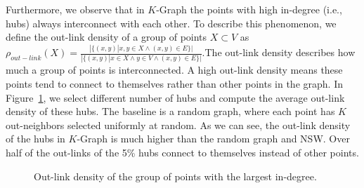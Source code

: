\documentclass[11pt]{article}
\begin{document}
Furthermore, we observe that in $K$-Graph the points with high in-degree (i.e., hubs) always interconnect with each other.
To describe this phenomenon, we define the out-link density of a group of points $X\subset V$ as $\rho_{out-link}(X) = \frac{|\{(x,y)|x, y\in X \wedge (x,y)\in E\}|}{|\{(x,y)|x \in X \wedge y \in V \wedge (x,y)\in E\}|}$.The out-link density describes how much a group of points is interconnected.
A high out-link density means these points tend to connect to themselves rather than other points in the graph.
In Figure~\ref{zeyu_fig:outlink-density}, we select different number of hubs and compute the average out-link density of these hubs.
The baseline is a random graph, where each point has $K$ out-neighbors selected uniformly at random. 
As we can see, the out-link density of the hubs in $K$-Graph is much higher than the random graph and NSW.
Over half of the out-links of the 5\% hubs connect to themselves instead of other points.
\begin{figure}
    \centering
    \caption{Out-link density of the group of points with the largest in-degree.}
    \label{zeyu_fig:outlink-density}
\end{figure}
\end{document}
